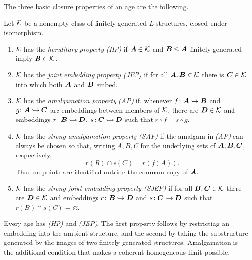 The three basic closure properties of an age are the following.

\begin{definition}
    Let \(\mathcal{K}\) be a nonempty class of finitely generated
    \(L\)-structures, closed under isomorphism.
    \begin{enumerate}
        \item \(\mathcal{K}\) has the \emph{hereditary property} \emph{(HP)}
              if \(\boldsymbol{A}\in\mathcal{K}\) and \(\boldsymbol{B}\leq \boldsymbol{A}\) finitely generated imply
              \(\boldsymbol{B}\in\mathcal{K}\).
        \item \(\mathcal{K}\) has the \emph{joint embedding property}
              \emph{(JEP)} if for all \(\boldsymbol{A},\boldsymbol{B}\in\mathcal{K}\) there is
              \(\boldsymbol{C}\in\mathcal{K}\) into which both \(\boldsymbol{A}\) and \(\boldsymbol{B}\) embed.
        \item \(\mathcal{K}\) has the \emph{amalgamation property} \emph{(AP)}
              if, whenever \(f\colon \boldsymbol{A}\hookrightarrow \boldsymbol{B}\) and
              \(g\colon \boldsymbol{A}\hookrightarrow \boldsymbol{C}\) are embeddings between members
              of \(\mathcal{K}\), there are \(\boldsymbol{D}\in\mathcal{K}\) and embeddings
              \(r\colon \boldsymbol{B}\hookrightarrow \boldsymbol{D}\), \(s\colon \boldsymbol{C}\hookrightarrow \boldsymbol{D}\)
              such that \(r\circ f=s\circ g\).
        \item \(\mathcal{K}\) has the \emph{strong amalgamation property}
              \emph{(SAP)} if the amalgam in \emph{(AP)} can always be chosen
              so that, writing \(A,B,C\) for the underlying sets of
              \(\boldsymbol{A},\boldsymbol{B},\boldsymbol{C}\), respectively,
              \[
                  r(B)\cap s(C)=r(f(A)).
              \]
              Thus no points are identified outside the common copy of
              \(\boldsymbol{A}\).
        \item \(\mathcal{K}\) has the \emph{strong joint embedding property}
              \emph{(SJEP)} if for all \(\boldsymbol{B},\boldsymbol{C}\in\mathcal{K}\) there are
              \(\boldsymbol{D}\in\mathcal{K}\) and embeddings
              \(r\colon\boldsymbol{B}\hookrightarrow\boldsymbol{D}\) and
              \(s\colon\boldsymbol{C}\hookrightarrow\boldsymbol{D}\) such that
              \(r(B)\cap s(C)=\varnothing\).
    \end{enumerate}
\end{definition}

Every age has \emph{(HP)} and \emph{(JEP)}.  The first property follows by
restricting an embedding into the ambient structure, and the second by taking
the substructure generated by the images of two finitely generated structures.
Amalgamation is the additional condition that makes a coherent homogeneous
limit possible.

